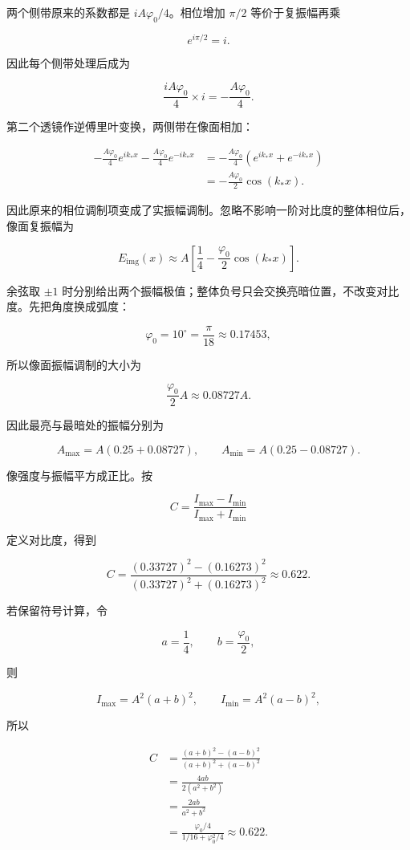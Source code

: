 \documentclass[12pt,a4paper,UTF8]{ctexart}
\begin{document}
两个侧带原来的系数都是 \(iA\varphi_0/4\)。相位增加 \(\pi/2\)
等价于复振幅再乘

\[e^{i\pi/2}=i.\]

因此每个侧带处理后成为

\[\frac{iA\varphi_0}{4}\times i
=-\frac{A\varphi_0}{4}.\]

第二个透镜作逆傅里叶变换，两侧带在像面相加：

\[\begin{aligned}
-\frac{A\varphi_0}{4}e^{ik_*x}
-\frac{A\varphi_0}{4}e^{-ik_*x}
&=-\frac{A\varphi_0}{4}
\left(e^{ik_*x}+e^{-ik_*x}\right)\\
&=-\frac{A\varphi_0}{2}\cos(k_*x).
\end{aligned}\]

因此原来的相位调制项变成了实振幅调制。忽略不影响一阶对比度的整体相位后，像面复振幅为

\[E_{\mathrm{img}}(x)
\approx A\left[\frac14-\frac{\varphi_0}{2}\cos(k_*x)\right].\]

余弦取 \(\pm1\)
时分别给出两个振幅极值；整体负号只会交换亮暗位置，不改变对比度。先把角度换成弧度：

\[\varphi_0=10^\circ=\frac\pi{18}\approx0.17453,\]

所以像面振幅调制的大小为

\[\frac{\varphi_0}{2}A\approx0.08727A.\]

因此最亮与最暗处的振幅分别为

\[A_{\max}=A(0.25+0.08727),\qquad
A_{\min}=A(0.25-0.08727).\]

像强度与振幅平方成正比。按

\[C=\frac{I_{\max}-I_{\min}}{I_{\max}+I_{\min}}\]

定义对比度，得到

\[C=
\frac{(0.33727)^2-(0.16273)^2}
{(0.33727)^2+(0.16273)^2}
\approx\boxed{0.622}.\]

若保留符号计算，令

\[a=\frac14,\qquad b=\frac{\varphi_0}{2},\]

则

\[I_{\max}=A^2(a+b)^2,\qquad
I_{\min}=A^2(a-b)^2,\]

所以

\[\begin{aligned}
C
&=\frac{(a+b)^2-(a-b)^2}{(a+b)^2+(a-b)^2}\\
&=\frac{4ab}{2(a^2+b^2)}\\
&=\frac{2ab}{a^2+b^2}\\
&=\frac{\varphi_0/4}{1/16+\varphi_0^2/4}
\approx0.622.
\end{aligned}\]
\end{document}
